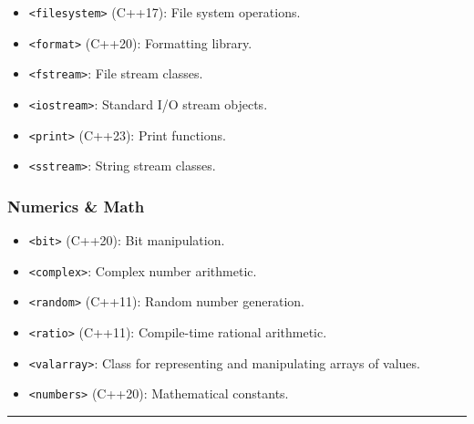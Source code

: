\begin{itemize}
\tightlist
\item
  \passthrough{\lstinline!<filesystem>!} (C++17): File system
  operations.
\item
  \passthrough{\lstinline!<format>!} (C++20): Formatting library.
\item
  \passthrough{\lstinline!<fstream>!}: File stream classes.
\item
  \passthrough{\lstinline!<iostream>!}: Standard I/O stream objects.
\item
  \passthrough{\lstinline!<print>!} (C++23): Print functions.
\item
  \passthrough{\lstinline!<sstream>!}: String stream classes.
\end{itemize}

\hypertarget{numerics-math}{%
\subsubsection{Numerics \& Math}\label{numerics-math}}

\begin{itemize}
\tightlist
\item
  \passthrough{\lstinline!<bit>!} (C++20): Bit manipulation.
\item
  \passthrough{\lstinline!<complex>!}: Complex number arithmetic.
\item
  \passthrough{\lstinline!<random>!} (C++11): Random number generation.
\item
  \passthrough{\lstinline!<ratio>!} (C++11): Compile-time rational
  arithmetic.
\item
  \passthrough{\lstinline!<valarray>!}: Class for representing and
  manipulating arrays of values.
\item
  \passthrough{\lstinline!<numbers>!} (C++20): Mathematical constants.
\end{itemize}

\begin{center}\rule{0.5\linewidth}{0.5pt}\end{center}
